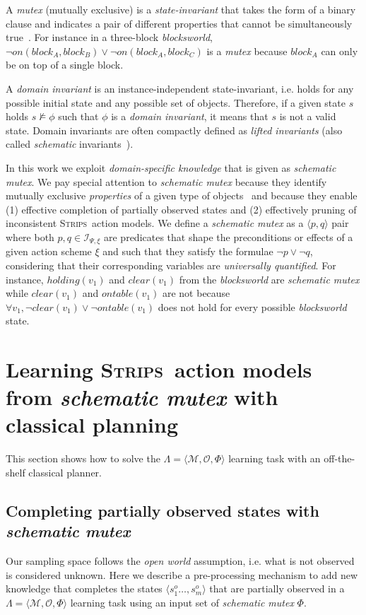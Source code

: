 \documentclass{article}
\newcommand{\tup}[1]{{\langle #1 \rangle}}
\newcommand{\strips}{\textsc{Strips}}
\begin{document}
A {\em mutex} (mutually exclusive) is a {\em state-invariant} that takes the form of a binary clause and indicates a pair of different properties that cannot be simultaneously true~\cite{kautz:mutex:IJCAI1999}. For instance in a three-block {\em blocksworld}, $\neg on(block_A,block_B)\vee \neg on(block_A,block_C)$ is a {\em mutex} because $block_A$ can only be on top of a single block.

A {\em domain invariant} is an instance-independent state-invariant, i.e. holds for any possible initial state and any possible set of objects. Therefore, if a given state $s$ holds $s\nvDash \phi$ such that $\phi$ is a {\em domain invariant}, it means that $s$ is not a valid state. Domain invariants are often compactly defined as {\em lifted invariants} (also called {\em schematic} invariants~\cite{rintanen:schematicInvariants:AAAI2017}).

In this work we exploit {\em domain-specific knowledge} that is given as  {\em schematic mutex}. We pay special attention to {\em schematic mutex} because they identify mutually exclusive {\em properties} of a given type of objects~\cite{fox:TIM:JAIR1998} and because they enable (1) effective completion of partially observed states and (2) effectively pruning of inconsistent \strips\ action models.  We define a {\em schematic mutex} as a $\tup{p,q}$ pair where both $p,q\in{\mathcal I}_{\Psi,\xi}$ are predicates that shape the preconditions or effects of a given action scheme $\xi$ and such that they satisfy the formulae $\neg p\vee \neg q$, considering that their corresponding variables are {\em universally quantified}. For instance, $holding(v_1)$ and $clear(v_1)$ from the {\em blocksworld} are {\em schematic mutex} while $clear(v_1)$ and $ontable(v_1)$ are not because $\forall v_1, \neg clear(v_1)\vee\neg ontable(v_1)$ does not hold for every possible {\em blocksworld} state.



\section{Learning \strips\ action models from {\em schematic mutex} with classical planning}
\label{sec:compilation}
This section shows how to solve the $\Lambda=\tup{\mathcal{M},{\mathcal O},\Phi}$ learning task with an off-the-shelf classical planner.

\subsection{Completing partially observed states with {\em schematic mutex}}
Our sampling space follows the {\em open world} assumption, i.e. what is not observed is considered unknown. Here we describe a pre-processing mechanism to add new knowledge that completes the states $\tup{s_1^o \ldots, s_m^o}$ that are partially observed in a $\Lambda=\tup{\mathcal{M},{\mathcal O},\Phi}$ learning task using an input set of {\em schematic mutex} $\Phi$.
\end{document}
